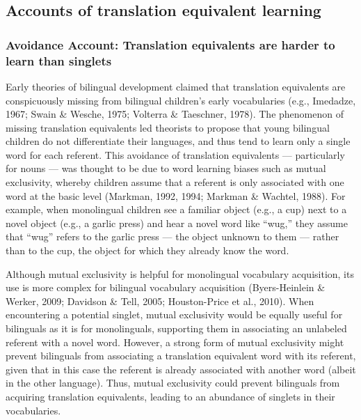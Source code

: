\documentclass[
  english,
  ,man,floatsintext]{apa6}
\begin{document}
\hypertarget{accounts-of-translation-equivalent-learning}{%
\subsection{Accounts of translation equivalent learning}\label{accounts-of-translation-equivalent-learning}}

\hypertarget{avoidance-account-translation-equivalents-are-harder-to-learn-than-singlets}{%
\subsubsection{Avoidance Account: Translation equivalents are harder to learn than singlets}\label{avoidance-account-translation-equivalents-are-harder-to-learn-than-singlets}}

Early theories of bilingual development claimed that translation equivalents are conspicuously missing from bilingual children's early vocabularies (e.g., Imedadze, 1967; Swain \& Wesche, 1975; Volterra \& Taeschner, 1978). The phenomenon of missing translation equivalents led theorists to propose that young bilingual children do not differentiate their languages, and thus tend to learn only a single word for each referent. This avoidance of translation equivalents --- particularly for nouns --- was thought to be due to word learning biases such as mutual exclusivity, whereby children assume that a referent is only associated with one word at the basic level (Markman, 1992, 1994; Markman \& Wachtel, 1988). For example, when monolingual children see a familiar object (e.g., a cup) next to a novel object (e.g., a garlic press) and hear a novel word like ``wug,'' they assume that ``wug'' refers to the garlic press --- the object unknown to them --- rather than to the cup, the object for which they already know the word.

Although mutual exclusivity is helpful for monolingual vocabulary acquisition, its use is more complex for bilingual vocabulary acquisition (Byers-Heinlein \& Werker, 2009; Davidson \& Tell, 2005; Houston-Price et al., 2010). When encountering a potential singlet, mutual exclusivity would be equally useful for bilinguals as it is for monolinguals, supporting them in associating an unlabeled referent with a novel word. However, a strong form of mutual exclusivity might prevent bilinguals from associating a translation equivalent word with its referent, given that in this case the referent is already associated with another word (albeit in the other language). Thus, mutual exclusivity could prevent bilinguals from acquiring translation equivalents, leading to an abundance of singlets in their vocabularies.
\end{document}
